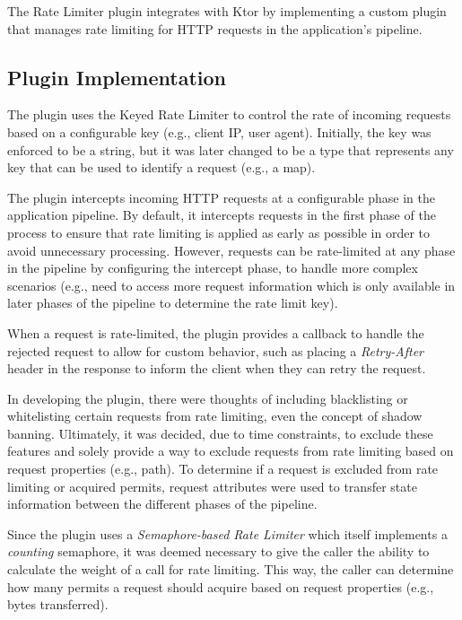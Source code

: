 The Rate Limiter plugin integrates with Ktor by implementing a custom plugin that manages rate limiting for HTTP requests in the application's pipeline.

\subsection{Plugin Implementation}\label{subsec:rate-limiter-plugin}

The plugin uses the Keyed Rate Limiter to control the rate of incoming requests based on a configurable key
(e.g., client IP, user agent).
Initially, the key was enforced to be a string,
but it was later changed to be a type that represents any key that can be used to identify a request (e.g., a map).


The plugin intercepts incoming HTTP requests at a configurable phase in the application pipeline.
By default,
it intercepts requests in the first phase of the process
to ensure that rate limiting is applied as early as possible in order to avoid unnecessary processing.
However, requests can be rate-limited at any phase in the pipeline by configuring the intercept phase,
to handle more complex scenarios
(e.g., need to access more request information which is only available in later phases of the pipeline to determine the rate limit key).

When a request is rate-limited,
the plugin provides a callback to handle the rejected request to allow for custom behavior,
such as placing a \textit{Retry-After} header in the response to inform the client when they can retry the request.

In developing the plugin,
there were thoughts of including blacklisting or whitelisting certain requests from rate limiting,
even the concept of shadow banning.
Ultimately,
it was decided, due to time constraints, to exclude these features
and solely provide a way to exclude requests from rate limiting based on request properties (e.g., path).
To determine if a request is excluded from rate limiting or acquired permits,
request attributes were used to transfer state information between the different phases of the pipeline.

Since the plugin uses a \textit{Semaphore-based Rate Limiter} which itself implements a \textit{counting} semaphore,
it was deemed necessary to give the caller the ability to calculate the weight of a call for rate limiting.
This way, the caller can determine how many permits a request should acquire based on request properties (e.g., bytes transferred).

